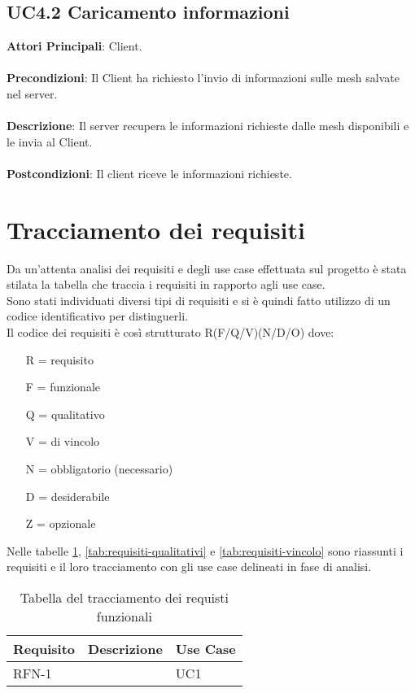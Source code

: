 \subsection{UC4.2 Caricamento informazioni}
\textbf{Attori Principali}: Client.
\\\\ \textbf{Precondizioni}: Il Client ha richiesto l'invio di informazioni sulle mesh salvate nel server.
\\\\ \textbf{Descrizione}: Il server recupera le informazioni richieste dalle mesh disponibili e le invia al Client.
\\\\ \textbf{Postcondizioni}: Il client riceve le informazioni richieste.


\section{Tracciamento dei requisiti}

Da un'attenta analisi dei requisiti e degli use case effettuata sul progetto è stata stilata la tabella che traccia i requisiti in rapporto agli use case.\\
Sono stati individuati diversi tipi di requisiti e si è quindi fatto utilizzo di un codice identificativo per distinguerli.\\
Il codice dei requisiti è così strutturato R(F/Q/V)(N/D/O) dove:
\begin{enumerate}
	\item[R =] requisito
    \item[F =] funzionale
    \item[Q =] qualitativo
    \item[V =] di vincolo
    \item[N =] obbligatorio (necessario)
    \item[D =] desiderabile
    \item[Z =] opzionale
\end{enumerate}
Nelle tabelle \ref{tab:requisiti-funzionali}, \ref{tab:requisiti-qualitativi} e \ref{tab:requisiti-vincolo} sono riassunti i requisiti e il loro tracciamento con gli use case delineati in fase di analisi.

\newpage

\begin{table}%
\caption{Tabella del tracciamento dei requisti funzionali}
\label{tab:requisiti-funzionali}
\begin{tabularx}{\textwidth}{lXl}
\hline\hline
\textbf{Requisito} & \textbf{Descrizione} & \textbf{Use Case}\\
\hline
RFN-1     &  & UC1 \\
\hline
\end{tabularx}
\end{table}%

